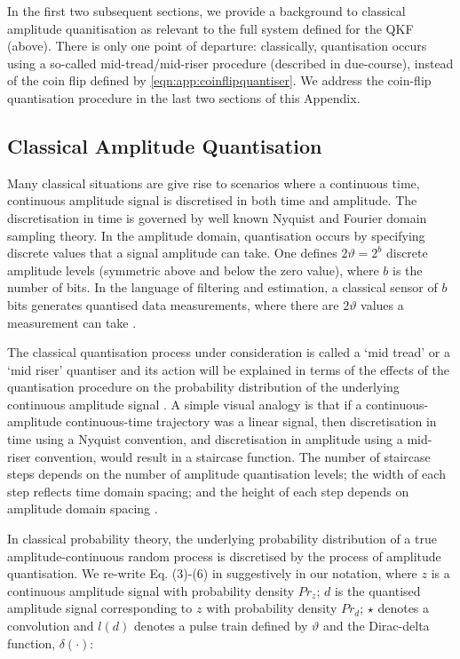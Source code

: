 In the first two subsequent sections, we provide a background to classical amplitude quanitisation as relevant to the full system defined for the QKF (above). There is only one point of departure: classically, quantisation occurs using a so-called mid-tread/mid-riser procedure (described in due-course), instead of the coin flip defined by \cref{eqn:app:coinflipquantiser}. We address the coin-flip quantisation procedure in the last two sections of this Appendix.

\subsection{Classical Amplitude Quantisation}

Many classical situations are give rise to scenarios where a continuous time, continuous amplitude signal is discretised in both time and amplitude. The discretisation in time is governed by well known Nyquist and Fourier domain sampling theory. In the amplitude domain, quantisation occurs by specifying discrete values that a signal amplitude can take. One defines $2\vartheta = 2^b$ discrete amplitude levels (symmetric above and below the zero value), where $b$ is the number of bits. In the language of filtering and estimation, a  classical sensor of $b$ bits generates quantised data measurements, where there are  $2\vartheta$ values a measurement can take \cite{karlsson2005}. 

The classical quantisation process under consideration is called a `mid tread' or a `mid riser' quantiser and its action will be explained in terms of the effects of the quantisation procedure on the probability distribution of the underlying continuous amplitude signal \cite{widrow1996,karlsson2005}. A simple visual analogy is that if a continuous-amplitude continuous-time trajectory was a linear signal, then discretisation in time using a Nyquist convention, and discretisation in amplitude using a mid-riser convention, would result in a staircase function. The number of staircase steps depends on the number of amplitude quantisation levels; the width of each step reflects time domain spacing; and the height of each step depends on amplitude domain spacing \cite{karlsson2005}.

In classical probability theory, the underlying probability distribution of a true amplitude-continuous random process is discretised by the process of amplitude quantisation. We re-write Eq. (3)-(6) in \cite{karlsson2005} suggestively in our notation, where $z$ is a continuous amplitude signal with probability density $Pr_z$; $d$ is the quantised amplitude signal corresponding to $z$ with probability density $Pr_d$; $\star$ denotes a convolution and $l(d)$ denotes a pulse train defined by $\vartheta$ and the Dirac-delta function, $\delta(\cdot)$:

